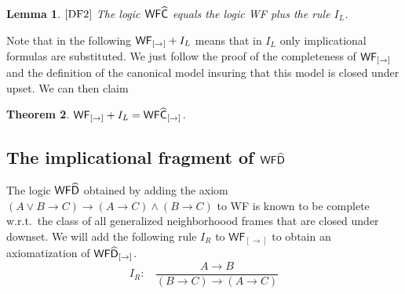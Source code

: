 \documentclass[12pt]{article}
\newtheorem{thm}{Theorem}[section]
\newtheorem{lem}[thm]{Lemma}
\newtheorem{dfn}[thm]{Definition}
\begin{document}
\begin{lem}$\cite{DF2}$
The logic ${\sf WF}\widehat{{\sf C}}  $ equals the logic {\sf WF}  plus the rule $ I_{L} $.
\end{lem}

Note that in the following ${\sf WF}_{[\rightarrow]}+I_{L}$   means that in $ I_{L}$ only implicational formulas are substituted.
We just follow the proof of the completeness of $ {\sf WF_{[\rightarrow]}} $ and the definition of the canonical model insuring that this model is closed under upset. We can then claim

\begin{thm} \label{C}
${\sf WF}_{[\rightarrow]}+ I_{L}={\sf WF}\widehat{{\sf C}}_{[\rightarrow]}  $.
\end{thm}

\subsection{The implicational fragment of ${\sf WF}\widehat{{\sf D}}  $}
The logic ${\sf WF}\widehat{{\sf D}}  $ obtained by adding the axiom $(A\vee B\rightarrow C)\rightarrow (A\rightarrow C)\wedge (B\rightarrow C)$ to {\sf WF} is known to be complete w.r.t.\ the class of all generalized neighborhoood frames that are closed under downset. We will add the following rule $ I_{R} $ to $\mathsf{WF_{[\rightarrow]}}$  to obtain an axiomatization of ${\sf WF}\widehat{{\sf D}}_{[\rightarrow]} $.
$$ I_{R}:~~~~\frac{A\rightarrow B}{(B\rightarrow C)\rightarrow (A\rightarrow C)}$$
\end{document}
